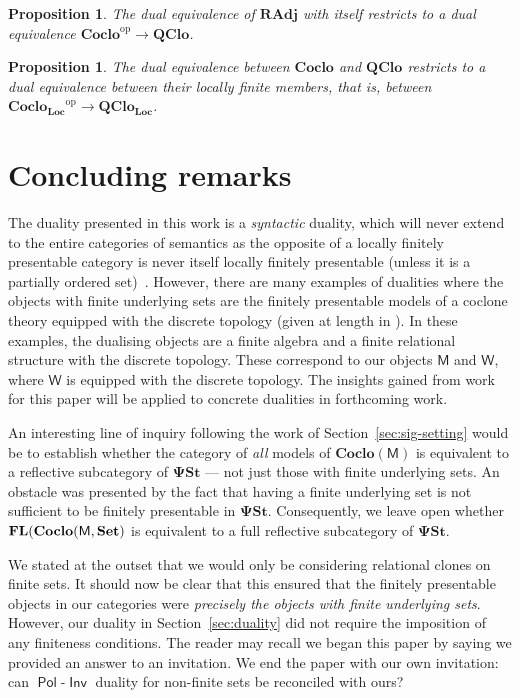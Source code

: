 \documentclass[11pt, a4paper, twoside,leqno]{amsart}
\newcommand{\cat}[1]{\mathbf{#1}}
\numberwithin{equation}{section}
\theoremstyle{plain}
\newtheorem{Prop}[Thm]{Proposition}
\theoremstyle{definition}
\newcommand{\Set}{\cat{Set}}
\DeclareMathOperator{\FL}{\bf FL}
\DeclareMathOperator{\Pol}{\mathsf{Pol}}
\DeclareMathOperator{\Inv}{\mathsf{Inv}}
\begin{document}
\begin{Prop}
  \label{prop:2}
  The dual equivalence of \(\cat{RAdj}\) with itself restricts to a dual
  equivalence \(\cat{Coclo}^{\mathrm{op}} \rightarrow
  \cat{QClo}\).
\end{Prop}

\begin{Prop}
  \label{prop:4}
  The dual equivalence between \(\cat{Coclo}\) and \(\cat{QClo}\) restricts to a dual
  equivalence between their locally finite members, that is, between \(\cat{Coclo_{Loc}}^{\mathrm{op}} \rightarrow \cat{QClo_{Loc}}\).
\end{Prop}

\section{Concluding remarks}
\label{sec:concluding-remarks}

The duality presented in this work is a \emph{syntactic} duality,
which will never extend to the entire categories of semantics as the opposite of
a locally finitely presentable category is never itself locally
finitely presentable (unless it is a partially ordered
set)~\cite{Gabriel:1971aa}. However, there are many examples of dualities where the objects with finite underlying
sets are the finitely presentable models of a coclone
theory equipped with the discrete topology (given at length in \cite{Clark:1998aa}). In these examples, the
dualising objects are a finite algebra and a finite relational
structure with the discrete topology. These correspond to our objects
\(\mathsf{M}\) and \(\mathsf{W}\), where \(\mathsf{W}\) is equipped
with the discrete topology.
The insights
gained from work for this paper will be applied to concrete dualities in forthcoming work.

An interesting line of inquiry following the work of Section~\ref{sec:sig-setting}
would be to establish whether the category of
\emph{all} models of \(\cat{Coclo}(\mathsf{M})\) is equivalent to a reflective
subcategory of \(\cat{\Psi St}\) --- not just those with finite
underlying sets. An obstacle was presented by the fact
that having a finite underlying set is not sufficient to be finitely
presentable in \(\cat{\Psi St}\). Consequently, we leave open whether
\(\FL(\cat{Coclo}(\mathsf{M},\Set)\) is equivalent to a full
reflective subcategory of \(\cat{\Psi St}\).

We stated at the outset that we would only be considering relational
clones 
on finite sets.
It should now be clear that this ensured that the finitely presentable
objects in our categories were \emph{precisely the objects with finite
  underlying sets}. However, our duality in Section~\ref{sec:duality} did not require the imposition
of any finiteness conditions. The reader may recall we began this paper by saying we provided an answer
to an invitation. We end the
paper with our own invitation: can
\(\Pol\)-\(\Inv\) duality for non-finite
sets be reconciled with ours?
\end{document}
